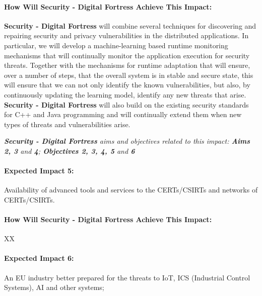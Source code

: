 \documentclass[a4paper,11pt]{article}
\newcommand{\project}[1]{\textbf{#1}\xspace}
\newcommand{\SECURITY}{\project{Security - Digital Fortress}}
\newcommand{\TheProject}{\SECURITY}
\begin{document}
\begin{mdframed}[backgroundcolor=gray!10]
\paragraph{How Will \TheProject{} Achieve This Impact:}
\TheProject{} will combine several techniques for discovering and repairing security and privacy vulnerabilities in the distributed applications. In particular, we will develop a machine-learning based runtime monitoring mechanisms that will continually monitor the application execution for security threats. Together with the mechanisms for runtime adaptation that will ensure, over a number of steps, that the overall system is in stable and secure state, this will ensure that we can not only identify the known vulnerabilities, but also, by continuously updating the learning model, identify any new threats that arise. \TheProject{} will also build on the existing security standards for C++ and Java programming and will continually extend them when new types of threats and vulnerabilities arise.

\emph{\TheProject{} aims and objectives related to this impact: \textbf{Aims 2, 3}  and \textbf{4}; \textbf{Objectives 2, 3, 4, 5} and \textbf{6} }


\end{mdframed}

\begin{mdframed}[backgroundcolor=blue!5]
\paragraph{Expected Impact 5:}
Availability of advanced tools and services to the CERTs/CSIRTs and networks of CERTs/CSIRTs.
\end{mdframed}

\begin{mdframed}[backgroundcolor=gray!10]
\paragraph{How Will \TheProject{} Achieve This Impact:}
XX
\end{mdframed}

\begin{mdframed}[backgroundcolor=blue!5]
\paragraph{Expected Impact 6:}
An EU industry better prepared for the threats to IoT, ICS (Industrial Control Systems), AI and other systems;
\end{mdframed}
\end{document}
